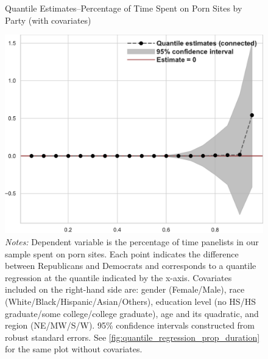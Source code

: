 \documentclass[12pt, letterpaper]{article}
\begin{document}
\begin{figure}[ht]
	\centering
	\caption{Quantile Estimates--Percentage of Time Spent on Porn Sites by Party (with covariates)}
	\includegraphics[width=.55\linewidth]{../figs/quantile_reg_covariates_proportion_duration_adult.pdf}
	\caption*{\footnotesize \emph{Notes:} 
		Dependent variable is the percentage of time panelists in our sample spent on porn sites.
		Each point indicates the difference between Republicans and Democrats and corresponds to a quantile regression at the quantile indicated by the x-axis.
		Covariates included on the right-hand side are: gender (Female/Male), race (White/Black/Hispanic/Asian/Others), education level (no HS/HS graduate/some college/college graduate), age and its quadratic, and region (NE/MW/S/W).
		95\% confidence intervals constructed from robust standard errors.
		See \cref{fig:quantile_regression_prop_duration} for the same plot without covariates.
	}
	\label{fig:quantile_regression_prop_duration_covariates}
\end{figure}
\end{document}
